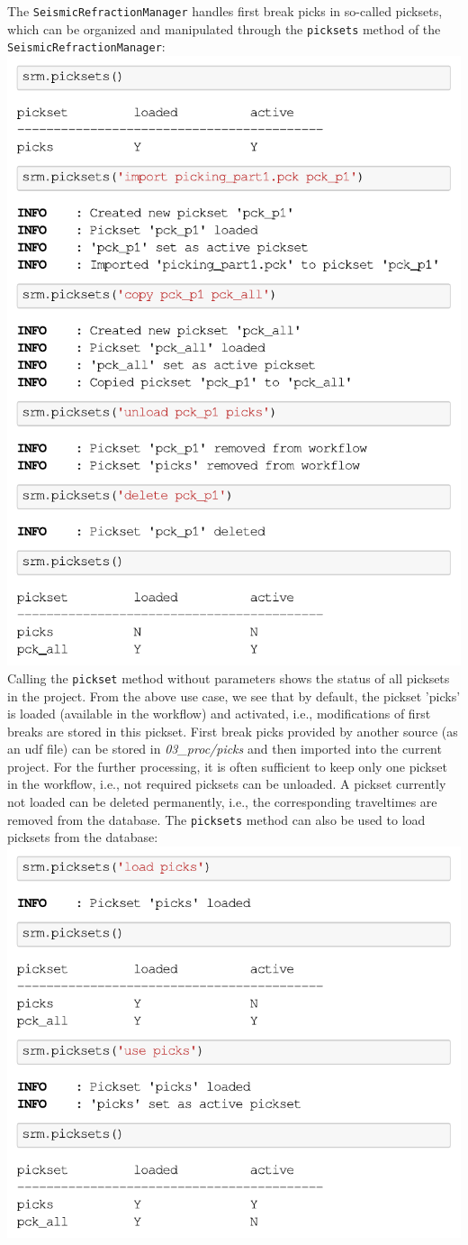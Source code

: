 \documentclass[a4paper,fleqn]{cas-sc}
\begin{document}
\clearpage
The \texttt{SeismicRefractionManager} handles first break picks in so-called picksets, which can be organized and manipulated through the \texttt{picksets} method of the \texttt{SeismicRefractionManager}:
\newline
\includegraphics[width=.5\textwidth]{./figures/picksets.pdf}
\newline
Calling the \texttt{pickset} method without parameters shows the status of all picksets in the project. From the above use case, we see that by default, the pickset 'picks' is loaded (available in the workflow) and activated, i.e., modifications of first breaks are stored in this pickset. First break picks provided by another source (as an udf file) can be stored in \textit{03\_proc/picks} and then imported into the current project.
For the further processing, it is often sufficient to keep only one pickset in the workflow, i.e., not required picksets can be unloaded. A pickset currently not loaded can be deleted permanently, i.e., the corresponding traveltimes are removed from the database. The \texttt{picksets} method can also be used to load picksets from the database:
\newline
\includegraphics[width=.5\textwidth]{./figures/load_picksets.pdf}
\end{document}
